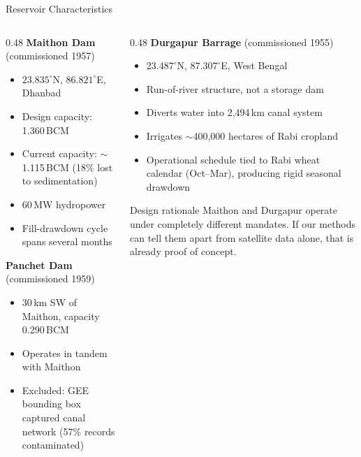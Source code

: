 \documentclass[10pt]{beamer}
\begin{document}
\begin{frame}{Reservoir Characteristics}
  \begin{columns}[T]
    \begin{column}{0.48\textwidth}
      \small\textbf{Maithon Dam} (commissioned 1957)
      \begin{itemize}\footnotesize
        \item $23.835^\circ$N, $86.821^\circ$E, Dhanbad
        \item Design capacity: 1.360\,BCM
        \item Current capacity: $\sim$1.115\,BCM
              (18\% lost to sedimentation)
        \item 60\,MW hydropower
        \item Fill-drawdown cycle spans several months
      \end{itemize}

      \vspace{4pt}
      \small\textbf{Panchet Dam} (commissioned 1959)
      \begin{itemize}\footnotesize
        \item 30\,km SW of Maithon, capacity 0.290\,BCM
        \item Operates in tandem with Maithon
        \item Excluded: GEE bounding box captured
              canal network (57\% records contaminated)
      \end{itemize}
    \end{column}
    \begin{column}{0.48\textwidth}
      \small\textbf{Durgapur Barrage} (commissioned 1955)
      \begin{itemize}\footnotesize
        \item $23.487^\circ$N, $87.307^\circ$E, West Bengal
        \item Run-of-river structure, not a storage dam
        \item Diverts water into 2,494\,km canal system
        \item Irrigates $\sim$400,000 hectares of Rabi cropland
        \item Operational schedule tied to Rabi wheat calendar
              (Oct--Mar), producing rigid seasonal drawdown
      \end{itemize}

      \vspace{4pt}
      \begin{exampleblock}{\small Design rationale}
        \footnotesize
        Maithon and Durgapur operate under completely
        different mandates. If our methods can tell them
        apart from satellite data alone, that is already
        proof of concept.
      \end{exampleblock}
    \end{column}
  \end{columns}
\end{frame}
\end{document}
